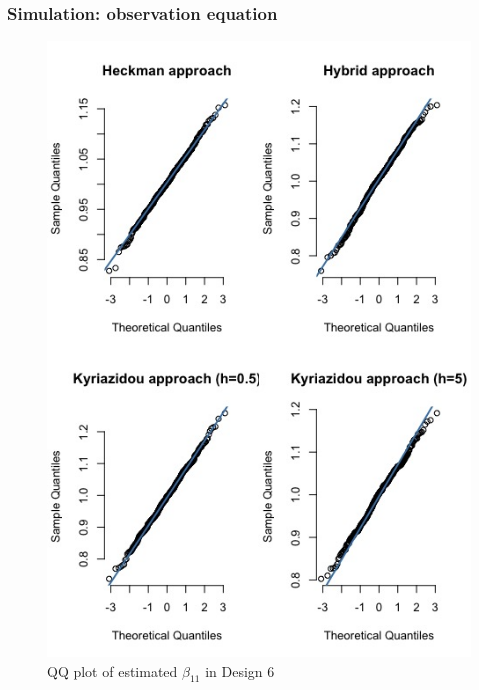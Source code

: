       \begin{frame}
        \frametitle{Simulation: observation equation}
      \begin{figure}[htbp]
        \centerline{\includegraphics[scale=.3]{content/Figures/QQ_beta_11_Design6.png}}
        \caption{\footnotesize{QQ plot of estimated $\beta_{11}$ in Design 6}}
        \label{QQ_beta_11_Design6}
      \end{figure}
    \end{frame}
